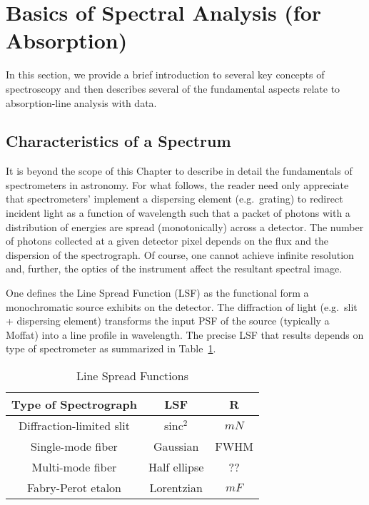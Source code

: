 \documentclass[graybox]{svmult}
\begin{document}

\section{Basics of Spectral Analysis (for Absorption)}
\label{sec:specanaly}

In this section, we provide a brief introduction to 
several key concepts of spectroscopy and then describes
several of the fundamental aspects relate to absorption-line
analysis with data.

\subsection{Characteristics of a Spectrum}

It is beyond the scope of this Chapter to describe in detail the
fundamentals of spectrometers in astronomy.  For what follows,
the reader need only appreciate that spectrometers' implement
a dispersing element (e.g.\ grating) to redirect incident light 
as a function of wavelength such that a packet of photons with
a distribution of energies are spread (monotonically) across a detector.
The number of photons collected at a given detector pixel depends
on the flux and the dispersion of the spectrograph.
Of course, one cannot achieve infinite resolution and, further, the
optics of the instrument affect the resultant spectral image.

One defines the Line Spread Function (LSF)
as the functional form a monochromatic source exhibits 
on the detector.
The diffraction of light (e.g.\ slit + dispersing element)
transforms the input PSF of the source (typically a Moffat) into a line 
profile in wavelength.  The precise 
LSF that results depends on type of spectrometer 
\cite[e.g.][]{robertson13} as summarized in Table~\ref{tab:LSF}.

\begin{table}[ht]
\begin{center}
\caption{{\sc Line Spread Functions}}
\label{tab:LSF}
\vskip 0.05in
\begin{tabular}{ccc}
\hline
Type of Spectrograph & LSF & R \\
\hline
Diffraction-limited slit & sinc$^2$     & $mN$ \\
Single-mode fiber        & Gaussian     & FWHM \\
Multi-mode fiber         & Half ellipse & ??\\ 
Fabry-Perot etalon       & Lorentzian   & $mF$ \\
\hline
\end{tabular}
\end{center}
\end{table}
\end{document}
